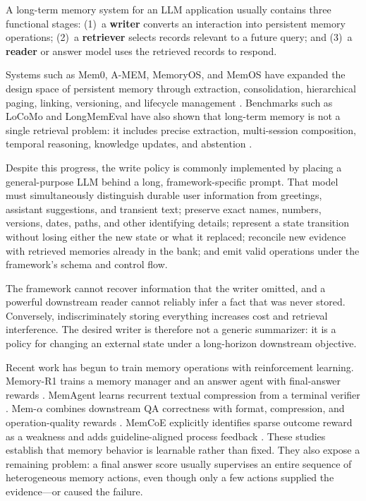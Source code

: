 \documentclass{article}
\begin{document}
A long-term memory system for an LLM application usually contains three functional stages:
(1)~a \textbf{writer} converts an interaction into persistent memory operations;
(2)~a \textbf{retriever} selects records relevant to a future query; and
(3)~a \textbf{reader} or answer model uses the retrieved records to respond.

Systems such as Mem0, A-MEM, MemoryOS, and MemOS have expanded the design space of persistent memory through extraction, consolidation, hierarchical paging, linking, versioning, and lifecycle management \citep{mem0,amem,memoryos,memos}. Benchmarks such as LoCoMo and LongMemEval have also shown that long-term memory is not a single retrieval problem: it includes precise extraction, multi-session composition, temporal reasoning, knowledge updates, and abstention \citep{locomo,longmemeval}.

Despite this progress, the write policy is commonly implemented by placing a general-purpose LLM behind a long, framework-specific prompt. That model must simultaneously distinguish durable user information from greetings, assistant suggestions, and transient text; preserve exact names, numbers, versions, dates, paths, and other identifying details; represent a state transition without losing either the new state or what it replaced; reconcile new evidence with retrieved memories already in the bank; and emit valid operations under the framework's schema and control flow.

The framework cannot recover information that the writer omitted, and a powerful downstream reader cannot reliably infer a fact that was never stored. Conversely, indiscriminately storing everything increases cost and retrieval interference. The desired writer is therefore not a generic summarizer: it is a policy for changing an external state under a long-horizon downstream objective.

Recent work has begun to train memory operations with reinforcement learning. Memory-R1 trains a memory manager and an answer agent with final-answer rewards \citep{memoryr1}. MemAgent learns recurrent textual compression from a terminal verifier \citep{memagent}. Mem-$\alpha$ combines downstream QA correctness with format, compression, and operation-quality rewards \citep{memalpha}. MemCoE explicitly identifies sparse outcome reward as a weakness and adds guideline-aligned process feedback \citep{memcoe}. These studies establish that memory behavior is learnable rather than fixed. They also expose a remaining problem: a final answer score usually supervises an entire sequence of heterogeneous memory actions, even though only a few actions supplied the evidence---or caused the failure.
\end{document}
